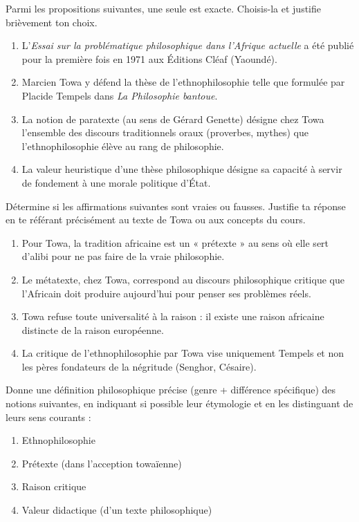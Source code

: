 \documentclass[11pt]{article}
\newcommand{\cle}[1]{{\popxbold\color{popdark}#1}}
\begin{document}
\begin{exercice}
Parmi les propositions suivantes, une seule est exacte. Choisis-la et justifie brièvement ton choix.
\begin{enumerate}
\item L'\emph{Essai sur la problématique philosophique dans l'Afrique actuelle} a été publié pour la première fois en 1971 aux Éditions Cléaf (Yaoundé).
\item Marcien Towa y défend la thèse de l'ethnophilosophie telle que formulée par Placide Tempels dans \emph{La Philosophie bantoue}.
\item La notion de \cle{paratexte} (au sens de Gérard Genette) désigne chez Towa l'ensemble des discours traditionnels oraux (proverbes, mythes) que l'ethnophilosophie élève au rang de philosophie.
\item La \cle{valeur heuristique} d'une thèse philosophique désigne sa capacité à servir de fondement à une morale politique d'État.
\end{enumerate}
\end{exercice}

\begin{exercice}
Détermine si les affirmations suivantes sont vraies ou fausses. Justifie ta réponse en te référant précisément au texte de Towa ou aux concepts du cours.
\begin{enumerate}
\item Pour Towa, la tradition africaine est un « prétexte » au sens où elle sert d'alibi pour ne pas faire de la vraie philosophie.
\item Le \cle{métatexte}, chez Towa, correspond au discours philosophique critique que l'Africain doit produire aujourd'hui pour penser ses problèmes réels.
\item Towa refuse toute universalité à la raison : il existe une raison africaine distincte de la raison européenne.
\item La critique de l'ethnophilosophie par Towa vise uniquement Tempels et non les pères fondateurs de la négritude (Senghor, Césaire).
\end{enumerate}
\end{exercice}

\begin{exercice}
Donne une définition philosophique précise (genre + différence spécifique) des notions suivantes, en indiquant si possible leur étymologie et en les distinguant de leurs sens courants :
\begin{enumerate}
\item \cle{Ethnophilosophie}
\item \cle{Prétexte} (dans l'acception towaïenne)
\item \cle{Raison critique}
\item \cle{Valeur didactique} (d'un texte philosophique)
\end{enumerate}
\end{exercice}
\end{document}
